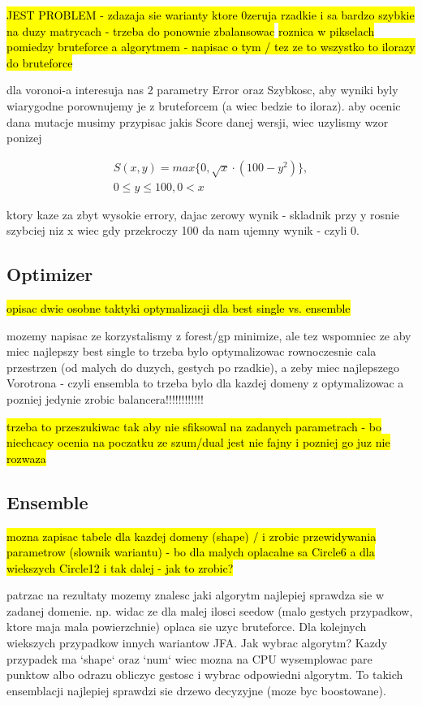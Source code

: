 \documentclass[format=acmsmall,screen,review,authordraft,nonacm]{acmart}
\begin{document}
\hl{JEST PROBLEM - zdazaja sie warianty ktore 0zeruja rzadkie i sa bardzo
szybkie na duzy matrycach - trzeba do ponownie zbalansowac}
\hl{roznica w pikselach pomiedzy bruteforce a algorytmem - napisac o tym / tez
ze to wszystko to ilorazy do bruteforce}

dla voronoi-a interesuja nas 2 parametry Error oraz Szybkosc, aby wyniki byly
wiarygodne porownujemy je z bruteforcem (a wiec bedzie to iloraz).
aby ocenic dana mutacje musimy przypisac jakis Score danej wersji, wiec uzylismy
wzor ponizej

\begin{align}
	S(x,y) = max\{0, \sqrt{x} \cdot (100-y^{2})\}, \\
0 \leq y \leq 100, 0 < x
\end{align}

ktory kaze za zbyt wysokie errory, dajac zerowy wynik - skladnik przy y rosnie
szybciej niz x wiec gdy przekroczy 100 da nam ujemny wynik - czyli 0.

\subsection{Optimizer} %

\hl{opisac dwie osobne taktyki optymalizacji dla best single vs. ensemble}

mozemy napisac ze korzystalismy z forest/gp minimize, ale tez wspomniec ze aby
miec najlepszy best single to trzeba bylo optymalizowac rownoczesnie cala
przestrzen (od malych do duzych, gestych po rzadkie), a zeby miec najlepszego
Vorotrona - czyli ensembla to trzeba bylo dla kazdej domeny z optymalizowac a
pozniej jedynie zrobic balancera!!!!!!!!!!!!

\hl{trzeba to przeszukiwac tak aby nie sfiksowal na zadanych parametrach - bo
niechcacy ocenia na poczatku ze szum/dual jest nie fajny i pozniej go juz nie
rozwaza}

\subsection{Ensemble} %

\hl{mozna zapisac tabele dla kazdej domeny (shape) / i zrobic przewidywania
parametrow (slownik wariantu) - bo dla malych oplacalne sa Circle6 a dla
wiekszych Circle12 i tak dalej - jak to zrobic?}

patrzac na rezultaty mozemy znalesc jaki algorytm najlepiej sprawdza sie w
zadanej domenie. np. widac ze dla malej ilosci seedow (malo gestych przypadkow,
ktore maja mala powierzchnie) oplaca sie uzyc bruteforce. Dla kolejnych
wiekszych przypadkow innych wariantow JFA. Jak wybrac algorytm? Kazdy przypadek ma `shape` oraz `num` wiec mozna na CPU wysemplowac
pare punktow albo odrazu obliczyc gestosc i wybrac odpowiedni algorytm.
To takich ensemblacji najlepiej sprawdzi sie drzewo decyzyjne (moze byc boostowane).
\end{document}
